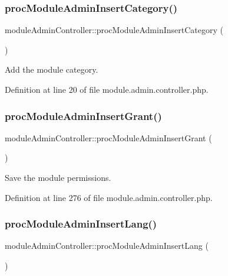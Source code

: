 \subsubsection{\texorpdfstring{proc\+Module\+Admin\+Insert\+Category()}{procModuleAdminInsertCategory()}}
{\footnotesize\ttfamily module\+Admin\+Controller\+::proc\+Module\+Admin\+Insert\+Category (\begin{DoxyParamCaption}{ }\end{DoxyParamCaption})}



Add the module category. 



Definition at line 20 of file module.\+admin.\+controller.\+php.

\mbox{\label{classmoduleAdminController_ac0d7a96f80e9c24260292f3caa9552e6}} 
\subsubsection{\texorpdfstring{proc\+Module\+Admin\+Insert\+Grant()}{procModuleAdminInsertGrant()}}
{\footnotesize\ttfamily module\+Admin\+Controller\+::proc\+Module\+Admin\+Insert\+Grant (\begin{DoxyParamCaption}{ }\end{DoxyParamCaption})}



Save the module permissions. 



Definition at line 276 of file module.\+admin.\+controller.\+php.

\mbox{\label{classmoduleAdminController_a302990c618bc055b581dbf26722b3560}} 
\subsubsection{\texorpdfstring{proc\+Module\+Admin\+Insert\+Lang()}{procModuleAdminInsertLang()}}
{\footnotesize\ttfamily module\+Admin\+Controller\+::proc\+Module\+Admin\+Insert\+Lang (\begin{DoxyParamCaption}{ }\end{DoxyParamCaption})}



